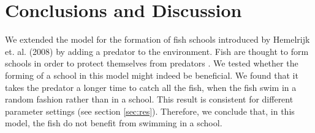 \documentclass[11pt,a4paper]{article}
\begin{document}
\section{Conclusions and Discussion}
\label{sec:concl}

We extended the model for the formation of fish schools introduced by Hemelrijk et. al. (2008) by adding a predator to the environment. Fish are thought to form schools in order to protect themselves from predators \cite{hemelrijk}. We tested whether the forming of a school in this model might indeed be beneficial. We found that it takes the predator a longer time to catch all the fish, when the fish swim in a random fashion rather than in a school. This result is consistent for different parameter settings (see section \ref{sec:res}). Therefore, we conclude that, in this model, the fish do not benefit from swimming in a school. 
\end{document}
